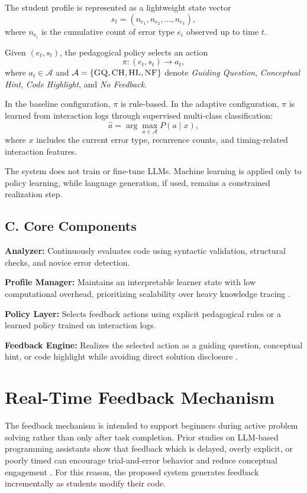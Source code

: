 \documentclass[conference]{IEEEtran}
\begin{document}
The student profile is represented as a lightweight state vector
\[
s_t = (n_{e_1}, n_{e_2}, \dots, n_{e_k}),
\]
where $n_{e_i}$ is the cumulative count of error type $e_i$ observed up to time $t$.

Given $(e_t, s_t)$, the pedagogical policy selects an action
\[
\pi: (e_t, s_t) \rightarrow a_t,
\]
where $a_t \in \mathcal{A}$ and
$\mathcal{A}=\{\textsc{GQ}, \textsc{CH}, \textsc{HL}, \textsc{NF}\}$
denote \emph{Guiding Question}, \emph{Conceptual Hint}, \emph{Code Highlight}, and \emph{No Feedback}.

In the baseline configuration, $\pi$ is rule-based. In the adaptive configuration, $\pi$ is learned from interaction logs through supervised multi-class classification:
\[
\hat{a} = \arg\max_{a \in \mathcal{A}} P(a \mid x),
\]
where $x$ includes the current error type, recurrence counts, and timing-related interaction features.

The system does not train or fine-tune LLMs. Machine learning is applied only to policy learning, while language generation, if used, remains a constrained realization step.

\subsection*{C. Core Components}

\textbf{Analyzer:} Continuously evaluates code using syntactic validation, structural checks, and novice error detection.

\textbf{Profile Manager:} Maintains an interpretable learner state with low computational overhead, prioritizing scalability over heavy knowledge tracing \cite{ProgTutor}.

\textbf{Policy Layer:} Selects feedback actions using explicit pedagogical rules or a learned policy trained on interaction logs.

\textbf{Feedback Engine:} Realizes the selected action as a guiding question, conceptual hint, or code highlight while avoiding direct solution disclosure \cite{DesirableCharacteristicsforAITeachingAssistantsinProgrammingEducation,CodeAid}.

\section{Real-Time Feedback Mechanism}

The feedback mechanism is intended to support beginners during active problem solving rather than only after task completion. Prior studies on LLM-based programming assistants show that feedback which is delayed, overly explicit, or poorly timed can encourage trial-and-error behavior and reduce conceptual engagement \cite{PatternsofLLMPoweredProgrammingAssistant}. For this reason, the proposed system generates feedback incrementally as students modify their code.
\end{document}

